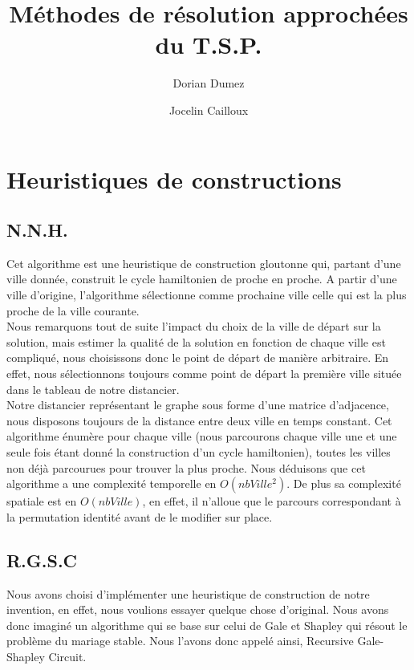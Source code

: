 \documentclass[12pt,a4paper]{article}
\title{Méthodes de résolution approchées du T.S.P.}
\author{Dorian Dumez \and Jocelin Cailloux}
\begin{document}
\maketitle
\tableofcontents

\section{Heuristiques de constructions}
\subsection{N.N.H.}
Cet algorithme est une heuristique de construction gloutonne qui, partant d'une ville donnée, construit le cycle hamiltonien de proche en proche. A partir d'une ville d'origine, l'algorithme sélectionne comme prochaine ville celle qui est la plus proche de la ville courante.\\

Nous remarquons tout de suite l'impact du choix de la ville de départ sur la solution, mais estimer la qualité de la solution en fonction de chaque ville est compliqué, nous choisissons donc le point de départ de manière arbitraire. En effet, nous sélectionnons toujours comme point de départ la première ville située dans le tableau de notre distancier.\\

Notre distancier représentant le graphe sous forme d'une matrice d'adjacence, nous disposons toujours de la distance entre deux ville en temps constant. Cet algorithme énumère pour chaque ville (nous parcourons chaque ville une et une seule fois étant donné la construction d'un cycle hamiltonien), toutes les villes non déjà parcourues pour trouver la plus proche. Nous déduisons que cet algorithme a une complexité temporelle en $O(nbVille^2)$. De plus sa complexité spatiale est en $O(nbVille)$, en effet, il n’alloue que le parcours correspondant à la permutation identité avant de le modifier sur place.\\

\subsection{R.G.S.C}
Nous avons choisi d'implémenter une heuristique de construction de notre invention, en effet, nous voulions essayer quelque chose d'original. Nous avons donc imaginé un algorithme qui se base sur celui de Gale et Shapley qui résout le problème du mariage stable. Nous l'avons donc appelé ainsi, Recursive Gale-Shapley Circuit.\\
\end{document}

